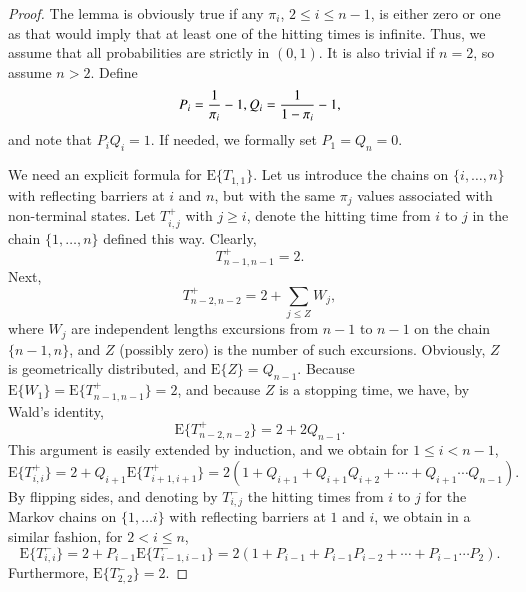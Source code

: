 \documentclass{elsarticle}
\newcommand{\EXP}{\mathrm{E}}
\newcommand{\PROB}{\Pr}
\begin{document}
\begin{proof}
The lemma is obviously true if any $\pi_i$, $2 \le i \le n-1$, is either
zero or one as that would imply that at least one of the hitting times is
infinite. Thus, we assume that all probabilities are strictly in $(0,1)$.
It is also trivial if $n=2$, so assume $n > 2$.
Define
\[
P_i = {1 \over \pi_i } - 1, Q_i = {1 \over 1-\pi_i} - 1,
\]
and note that $P_i Q_i = 1$.
If needed, we formally set $P_1 = Q_n = 0$.
%  

We need an explicit formula for $\EXP \{ T_{1,1} \}$.
Let us introduce the chains on $\{ i, \ldots , n \}$ with
reflecting barriers at $i$ and $n$, but with the same $\pi_j$ values
associated with non-terminal states. 
Let $T^+_{i,j}$ with $j \ge i$, denote the hitting time from $i$ to $j$ in the chain $\{1,\ldots,n\}$ defined this way.
Clearly,
\[
T^+_{n-1, n-1} = 2.
\]
Next,
\[
T^+_{n-2, n-2 } = 2 + \sum_{j \le Z} W_j,
\]
where $W_j$ are independent lengths excursions from $n-1$ to  $n-1$
on the chain $\{ n-1, n \}$, and $Z$ (possibly zero) is the number of such excursions.
Obviously, $Z$ is geometrically distributed, and $\EXP \{ Z \} = Q_{n-1}$.
Because $\EXP \{ W_1 \} = \EXP \{ T^+_{n-1, n-1} \} = 2$,
and because $Z$ is a stopping time, 
we have, by Wald's identity,
\[
\EXP \{ T^+_{n-2, n-2} \} = 2 + 2 Q_{n-1}.
\]
This argument is easily extended by induction, and we obtain for $1 \le i < n-1$,
\[
\EXP \{ T^+_{i, i} \}  = 2 + Q_{i+1} \EXP \{ T^+_{i+1, i+1} \}
  = 2 \left( 1 + Q_{i+1} + Q_{i+1} Q_{i+2} + \cdots + Q_{i+1} \cdots Q_{n-1} \right).
\]
By flipping sides, and denoting by $T^-_{i,j}$ the hitting times from
$i$ to $j$ for the Markov chains on $\{ 1, \ldots i \}$ with reflecting
barriers at $1$ and $i$, we obtain in a similar fashion, for $2 <
i \le n$,
\[
\EXP \{ T^-_{i, i} \}  = 2 + P_{i-1} \EXP \{ T^-_{i-1, i-1} \}
  = 2 \left( 1 + P_{i-1} + P_{i-1} P_{i-2} + \cdots + P_{i-1} \cdots P_{2} \right).
\]
Furthermore, $\EXP \{ T^-_{2, 2} \}  =2$.


\end{proof}
\end{document}

